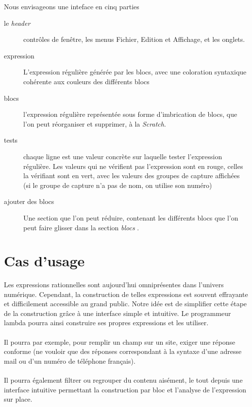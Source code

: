 \documentclass{article}
\begin{document}
    Nous envisageons une inteface en cinq parties
    \begin{description}
        \item[le \emph{header} ] contrôles de fenêtre, les menus Fichier, Edition et Affichage, et les onglets.
            \item[expression] L'expression régulière générée par les blocs, avec une coloration syntaxique cohérente aux couleurs des différents blocs

            \item[blocs] l'expression régulière représentée sous forme d'imbrication de blocs, que l'on peut réorganiser et supprimer, à la \emph{Scratch}.

                \item[tests] chaque ligne est une valeur concrète sur laquelle tester l'expression régulière.
                    Les valeurs qui ne vérifient pas l'expression sont en rouge, celles la vérifiant sont en vert, avec les valeurs des groupes de capture affichées (si le groupe de capture n'a pas de nom, on utilise son numéro)

\item[ajouter des blocs] Une section que l'on peut réduire, contenant les différents blocs que l'on peut faire glisser dans la section \emph{blocs} .
    \end{description}
    
    \section{Cas d'usage}
    \paragraph{}
    
    Les expressions rationnelles sont aujourd’hui omniprésentes dans l’univers  numérique. Cependant, la construction de telles expressions est souvent effrayante et difficilement accessible au grand public. Notre idée est de simplifier cette étape de la construction grâce à une interface simple et intuitive. Le programmeur lambda pourra ainsi construire ses propres expressions et les utiliser. 

    \paragraph{}
    Il pourra par exemple, pour remplir un champ sur un  site, exiger une réponse conforme (ne vouloir que des réponses correspondant à la syntaxe d’une adresse mail ou d’un numéro de téléphone français). 

    \paragraph{}
    Il pourra également filtrer ou regrouper du contenu aisément, le tout depuis une interface intuitive permettant la construction par bloc et l’analyse de l’expression sur place.
    
\end{document}
